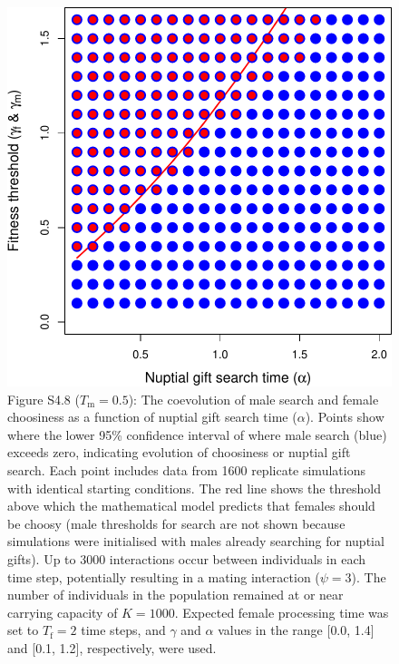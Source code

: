 \documentclass[
]{article}
\begin{document}
\captionsetup{labelformat=default}

\clearpage

\captionsetup{labelformat=empty}

\begin{figure}
\centering
\includegraphics{ms_refs_fixed_files/figure-latex/unnamed-chunk-13-1.pdf}
\caption{Figure S4.8 (\(T_{\mathrm{m}} = 0.5\)): The coevolution of male
search and female choosiness as a function of nuptial gift search time
(\(\alpha\)). Points show where the lower 95\% confidence interval of
where male search (blue) exceeds zero, indicating evolution of
choosiness or nuptial gift search. Each point includes data from 1600
replicate simulations with identical starting conditions. The red line
shows the threshold above which the mathematical model predicts that
females should be choosy (male thresholds for search are not shown
because simulations were initialised with males already searching for
nuptial gifts). Up to 3000 interactions occur between individuals in
each time step, potentially resulting in a mating interaction
(\(\psi = 3\)). The number of individuals in the population remained at
or near carrying capacity of \(K = 1000\). Expected female processing
time was set to \(T_{\mathrm{f}}=2\) time steps, and \(\gamma\) and
\(\alpha\) values in the range {[}0.0, 1.4{]} and {[}0.1, 1.2{]},
respectively, were used.}
\end{figure}
\end{document}
